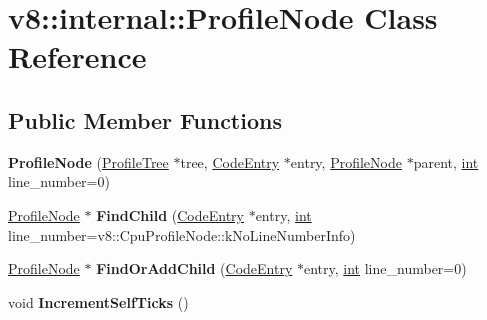 \hypertarget{classv8_1_1internal_1_1ProfileNode}{}\section{v8\+:\+:internal\+:\+:Profile\+Node Class Reference}
\label{classv8_1_1internal_1_1ProfileNode}
\subsection*{Public Member Functions}
\begin{DoxyCompactItemize}
\item 
\mbox{\label{classv8_1_1internal_1_1ProfileNode_a785b81d8926be1218eb07b398d3cbd44}} 
{\bfseries Profile\+Node} (\mbox{\hyperlink{classv8_1_1internal_1_1ProfileTree}{Profile\+Tree}} $\ast$tree, \mbox{\hyperlink{classv8_1_1internal_1_1CodeEntry}{Code\+Entry}} $\ast$entry, \mbox{\hyperlink{classv8_1_1internal_1_1ProfileNode}{Profile\+Node}} $\ast$parent, \mbox{\hyperlink{classint}{int}} line\+\_\+number=0)
\item 
\mbox{\label{classv8_1_1internal_1_1ProfileNode_aadd62ffa8b431134ace6b04909a5602e}} 
\mbox{\hyperlink{classv8_1_1internal_1_1ProfileNode}{Profile\+Node}} $\ast$ {\bfseries Find\+Child} (\mbox{\hyperlink{classv8_1_1internal_1_1CodeEntry}{Code\+Entry}} $\ast$entry, \mbox{\hyperlink{classint}{int}} line\+\_\+number=v8\+::\+Cpu\+Profile\+Node\+::k\+No\+Line\+Number\+Info)
\item 
\mbox{\label{classv8_1_1internal_1_1ProfileNode_a75cbdc06b4117fcce3cd9bddc106b9bd}} 
\mbox{\hyperlink{classv8_1_1internal_1_1ProfileNode}{Profile\+Node}} $\ast$ {\bfseries Find\+Or\+Add\+Child} (\mbox{\hyperlink{classv8_1_1internal_1_1CodeEntry}{Code\+Entry}} $\ast$entry, \mbox{\hyperlink{classint}{int}} line\+\_\+number=0)
\item 
\mbox{\label{classv8_1_1internal_1_1ProfileNode_a651b8b8c09b8a8dda1acb22d41bebd09}} 
void {\bfseries Increment\+Self\+Ticks} ()
\item 
\mbox{\label{classv8_1_1internal_1_1ProfileNode_af4feb4a8fec76e8bc6d0426ae261bb0c}} 

\end{DoxyCompactItemize}
